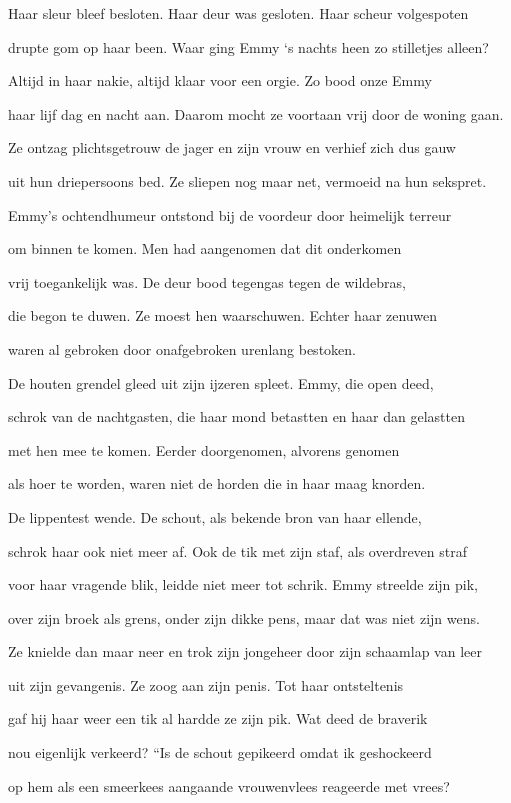 Haar sleur bleef besloten.
Haar deur was gesloten.
Haar scheur volgespoten

drupte gom op haar been.
Waar ging Emmy ‘s nachts heen
zo stilletjes alleen?

Altijd in haar nakie,
altijd klaar voor een orgie.
Zo bood onze Emmy

haar lijf dag en nacht aan.
Daarom mocht ze voortaan
vrij door de woning gaan.

Ze ontzag plichtsgetrouw
de jager en zijn vrouw
en verhief zich dus gauw

uit hun driepersoons bed.
Ze sliepen nog maar net,
vermoeid na hun sekspret.

Emmy’s ochtendhumeur
ontstond bij de voordeur
door heimelijk terreur

om binnen te komen.
Men had aangenomen
dat dit onderkomen

vrij toegankelijk was.
De deur bood tegengas
tegen de wildebras,

die begon te duwen.
Ze moest hen waarschuwen.
Echter haar zenuwen

waren al gebroken
door onafgebroken
urenlang bestoken.

De houten grendel gleed
uit zijn ijzeren spleet.
Emmy, die open deed,

schrok van de nachtgasten,
die haar mond betastten
en haar dan gelastten

met hen mee te komen.
Eerder doorgenomen,
alvorens genomen

als hoer te worden,
waren niet de horden
die in haar maag knorden.

De lippentest wende.
De schout, als bekende
bron van haar ellende,

schrok haar ook niet meer af.
Ook de tik met zijn staf,
als overdreven straf

voor haar vragende blik,
leidde niet meer tot schrik.
Emmy streelde zijn pik,

over zijn broek als grens,
onder zijn dikke pens,
maar dat was niet zijn wens.

Ze knielde dan maar neer
en trok zijn jongeheer
door zijn schaamlap van leer

uit zijn gevangenis.
Ze zoog aan zijn penis.
Tot haar ontsteltenis

gaf hij haar weer een tik
al hardde ze zijn pik.
Wat deed de braverik

nou eigenlijk verkeerd?
“Is de schout gepikeerd
omdat ik geshockeerd

op hem als een smeerkees
aangaande vrouwenvlees
reageerde met vrees?

